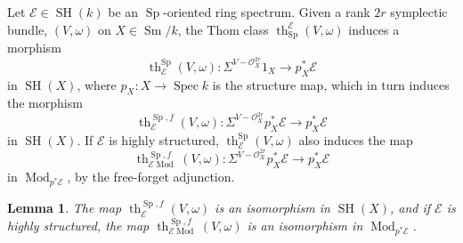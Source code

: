 \documentclass[10pt]{amsart}
\theoremstyle{definition}
\theoremstyle{plain}
\newtheorem{lemma}[defn]{Lemma}
\numberwithin{equation}{section}
\newcommand{\0}{\emptyset}
\newcommand{\sE}{{\mathcal E}}
\newcommand{\sO}{{\mathcal O}}
\newcommand{\Sp}{{\operatorname{Sp}}}
\newcommand{\Spec}{{\operatorname{Spec}}}
\newcommand{\SH}{{\operatorname{SH}}}
\newcommand{\Sm}{{\operatorname{Sm}}}
\renewcommand{\th}{{\operatorname{th}}}
\newcommand{\Mod}{{\operatorname{Mod}}}
\begin{document}
Let $\sE\in \SH(k)$ be an $\Sp$-oriented ring spectrum. Given a rank $2r$ symplectic bundle, $(V,\omega)$ on $X\in \Sm/k$,  the Thom class $\th^\sE_\Sp(V,\omega)$ induces a morphism
\[
\th^{\Sp}_\sE(V,\omega):\Sigma^{V-\sO_X^{2r}}1_X\to p_X^*\sE
\]
in $\SH(X)$, where $p_X:X\to \Spec k$ is the structure map, which in turn induces the morphism
\[
\th^{\Sp,f}_{\sE}(V,\omega):\Sigma^{V-\sO_X^{2r}}p_X^*\sE\to p_X^*\sE
\]
in $\SH(X)$. If $\sE$ is highly structured, $\th^{\Sp}_\sE(V,\omega)$ also induces the map 
\[
\th^{\Sp, f}_{\sE\Mod}(V,\omega):\Sigma^{V-\sO_X^{2r}}p_X^*\sE\to p_X^*\sE 
\]
in $\Mod_{p^*\sE}$, by the free-forget adjunction.

\begin{lemma}
\label{lemma:beforethom}
    The map $\th^{\Sp,f}_{\sE}(V,\omega)$ is an isomorphism in $\SH(X)$, and if $\sE$ is highly structured, the map $\th^{\Sp, f}_{\sE\Mod}(V,\omega)$ is an isomorphism in $\Mod_{p^*\sE}$.
\end{lemma}
\end{document}
